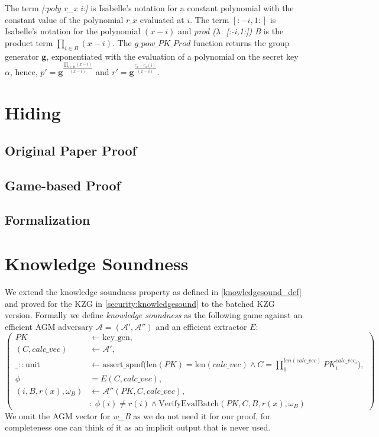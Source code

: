 The term \textit{[:poly r\_x i:]} is Isabelle's notation for a constant polynomial with the constant value of the polynomial $r\_x$ evaluated at $i$. The term $[:-i,1:]$ is Isabelle's notation for the polynomial $(x-i)$ and \textit{prod ($\lambda$. [:-i,1:]) B} is the product term $\prod_{i\in B}^{}(x-i)$. The $g\_pow\_PK\_Prod$ function returns the group generator $\mathbf{g}$, exponentiated with the evaluation of a polynomial on the secret key $\alpha$, hence, $p'=\mathbf{g}^{\frac{\prod_{i\in B}^{}(x-i)}{(x-i)}}$ and $r'=\mathbf{g}^{\frac{r_x-r_x(i)}{(x-i)}}$.

\section{Hiding}

\subsection*{Original Paper Proof}

\subsection*{Game-based Proof}

\subsection*{Formalization}

\section{Knowledge Soundness}
We extend the knowledge soundness property as defined in \ref{knowledgesound_def}
and proved for the KZG in \ref{security:knowledgesound} to the batched KZG version. Formally we define \textit{knowledge soundness} as the following game against an efficient AGM adversary $\mathcal{A=(A',A'')}$ and an efficient extractor $E$: 
\begin{equation*}
    \left(
        \begin{aligned}
            PK &\leftarrow \text{key\_gen}, \\
            (C,calc\_vec) &\leftarrow \mathcal{A'}, \\
            \_::\text{unit} &\leftarrow \text{assert\_spmf}\biggl(\text{len}(PK)=\text{len}(calc\_vec) \land C = \prod_{1}^{len(calc\_vec)}PK_i^{calc\_vec_i}\biggr), \\
            \phi &= E(C, calc\_vec),\\
            (i, B, r(x), \omega_B) &\leftarrow \mathcal{A''}(PK, C, calc\_vec), \\
            & : \ \phi(i) \ne r(i) \land \text{VerifyEvalBatch}(PK,C,B,r(x),\omega_B)
        \end{aligned}
        \right)
\end{equation*}
We omit the AGM vector for \textit{w\_B} as we do not need it for our proof, for completeness one can think of it as an implicit output that is never used.

